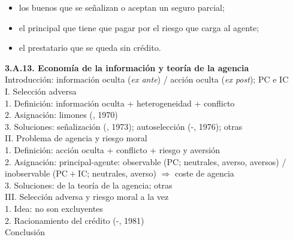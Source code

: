 \documentclass[11pt]{article}
\begin{document}
\begin{itemize}
\begin{itemize}
\begin{itemize}
      \begin{itemize}
      \item los buenos que se señalizan o aceptan un seguro parcial;
      \item el principal que tiene que pagar por el riesgo que carga al agente;
      \item el prestatario que se queda sin crédito.
      \end{itemize}
    \end{itemize}
  \end{itemize}
\end{itemize}

\begin{esquema}
\textbf{3.A.13. Economía de la información y teoría de la agencia}\\[2pt]
Introducción: información oculta (\emph{ex ante}) / acción oculta (\emph{ex post}); $\mathrm{PC}$ e $\mathrm{IC}$\\
I. Selección adversa\\
\hspace*{1.5em}1. Definición: información oculta + heterogeneidad + conflicto\\
\hspace*{1.5em}2. Asignación: limones (, 1970)\\
\hspace*{1.5em}3. Soluciones: señalización (, 1973); autoselección (-, 1976); otras\\
II. Problema de agencia y riesgo moral\\
\hspace*{1.5em}1. Definición: acción oculta + conflicto + riesgo y aversión\\
\hspace*{1.5em}2. Asignación: principal-agente: observable (PC; neutrales, averso, aversos) / inobservable ($\mathrm{PC}+\mathrm{IC}$; neutrales, averso) $\Rightarrow$ coste de agencia\\
\hspace*{1.5em}3. Soluciones: de la teoría de la agencia; otras\\
III. Selección adversa y riesgo moral a la vez\\
\hspace*{1.5em}1. Idea: no son excluyentes\\
\hspace*{1.5em}2. Racionamiento del crédito (-, 1981)\\
Conclusión
\end{esquema}
\end{document}
